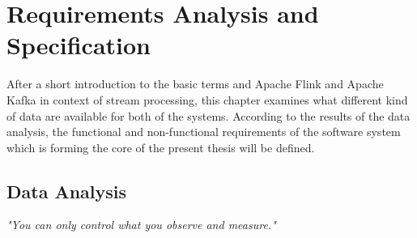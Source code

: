 \chapter{Requirements Analysis and Specification}

After a short introduction to the basic terms and Apache Flink and Apache Kafka in context of stream processing, this chapter
examines what different kind of data are available for both of the systems. According to the results of the data analysis, the
functional and non-functional requirements of the software system which is forming the core of the present thesis will be defined.

\section{Data Analysis}

\textit{"You can only control what you observe and measure."}\cite{Ebert07}

%
%
%
%
%

